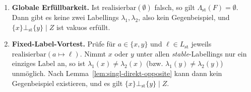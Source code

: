 \begin{enumerate}
    \item \textbf{Globale Erfüllbarkeit.} Ist
    \(\mathrm{realisierbar}(\emptyset)\) falsch, so gilt
    \(\Lambda_{\mathrm{st}}(F)=\emptyset\). Dann gibt es keine zwei Labellings
    \(\lambda_1,\lambda_2\), also kein Gegenbeispiel, und
    \(\{x\}\bot_{\mathrm{st}}\{y\}\mid Z\) ist vakuos erfüllt.

    \item \textbf{Fixed-Label-Vortest.} Prüfe für \(a\in\{x,y\}\) und
    \(\ell\in L_{\mathrm{st}}\) jeweils \(\mathrm{realisierbar}(a\mapsto\ell)\).
    Nimmt \(x\) oder \(y\) unter allen \textit{stable}-Labellings nur ein
    einziges Label an, so ist \(\lambda_1(x)\neq\lambda_2(x)\) (bzw.
    \(\lambda_1(y)\neq\lambda_2(y)\)) unmöglich. Nach
    Lemma~\ref{lem:singl-direkt-opposite} kann dann kein Gegenbeispiel
    existieren, und es gilt \(\{x\}\bot_{\mathrm{st}}\{y\}\mid Z\).


\end{enumerate}
